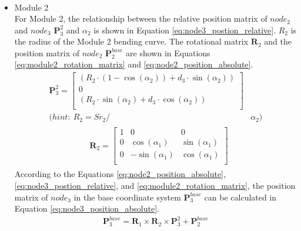 \begin{itemize}
\begin{align}
        \label{eq:node2_position_absolute}
    \end{align}
    \item Module 2 \\
    For Module 2, the relationship between the relative position matrix of $node_2$ and $node_3$ $\textbf{P}_{3}^{2}$ 
    and $\alpha_2$ is shown in Equation \ref{eq:node3_postion_relative}. $R_2$ is the radius of the Module 2 bending 
    curve. The rotational matrix $\textbf{R}_{2}$ and the position matrix of $node_2$ $\textbf{P}_{2}^{base}$ are shown 
    in Equations \ref*{eq:module2_rotation_matrix} and \ref{eq:node2_position_absolute}.
    \begin{align}
        \textbf{P}_{3}^{2} = 
        \begin{bmatrix}
            (R_2\cdot(1-\cos(\alpha_2)) + d_3\cdot \sin(\alpha_2)) \\
            0 \\
            (R_2\cdot \sin(\alpha_2) + d_3\cdot \cos(\alpha_2)) \\
        \end{bmatrix}&
        \label{eq:node3_postion_relative} \\
        \nonumber (hint: \ R_2 = {Sr}_2/ &\alpha_2)
    \end{align}
    \vspace{-15mm}
    \begin{align}
        &\begin{aligned}
            \textbf{R}_{2} = 
            \begin{bmatrix}
                1 & 0 & 0 \\
                0 & \cos(\alpha_1) & \sin(\alpha_1) \\
                0 & -\sin(\alpha_1) & \cos(\alpha_1) \\
            \end{bmatrix}
        \end{aligned}
        \label{eq:module2_rotation_matrix}
    \end{align}
    According to the Equations \ref{eq:node2_position_absolute}, \ref{eq:node3_postion_relative}, and 
    \ref*{eq:module2_rotation_matrix}, the position matrix of $node_{3}$ in the base coordinate system 
    $\textbf{P}_{3}^{base}$ can be calculated in Equation \ref{eq:node3_position_absolute}.
    \begin{align}
        \textbf{P}_{3}^{base} = \textbf{R}_{1} \times \textbf{R}_{2} 
        \times \textbf{P}_{3}^{2} + \textbf{P}_{2}^{base}
        \label{eq:node3_position_absolute}

\end{align}
\end{itemize}
